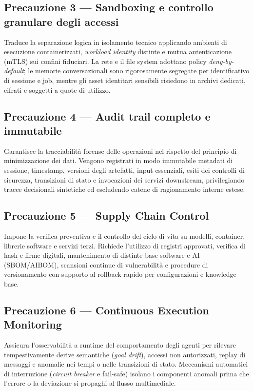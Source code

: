 \documentclass[11pt,a4paper]{article}
\begin{document}
\subsection{Precauzione 3 --- Sandboxing e controllo granulare degli accessi}
Traduce la separazione logica in isolamento tecnico applicando ambienti di esecuzione containerizzati, \emph{workload identity} distinte e mutua autenticazione (mTLS) sui confini fiduciari. La rete e il file system adottano policy \emph{deny-by-default}; le memorie conversazionali sono rigorosamente segregate per identificativo di sessione e job, mentre gli asset identitari sensibili risiedono in archivi dedicati, cifrati e soggetti a quote di utilizzo.

\subsection{Precauzione 4 --- Audit trail completo e immutabile}
Garantisce la tracciabilità forense delle operazioni nel rispetto del principio di minimizzazione dei dati. Vengono registrati in modo immutabile metadati di sessione, timestamp, versioni degli artefatti, input essenziali, esiti dei controlli di sicurezza, transizioni di stato e invocazioni dei servizi downstream, privilegiando tracce decisionali sintetiche ed escludendo catene di ragionamento interne estese.

\subsection{Precauzione 5 --- Supply Chain Control}
Impone la verifica preventiva e il controllo del ciclo di vita su modelli, container, librerie software e servizi terzi. Richiede l'utilizzo di registri approvati, verifica di hash e firme digitali, mantenimento di distinte base software e AI (SBOM/AIBOM), scansioni continue di vulnerabilità e procedure di versionamento con supporto al rollback rapido per configurazioni e knowledge base.

\subsection{Precauzione 6 --- Continuous Execution Monitoring}
Assicura l'osservabilità a runtime del comportamento degli agenti per rilevare tempestivamente derive semantiche (\emph{goal drift}), accessi non autorizzati, replay di messaggi e anomalie nei tempi o nelle transizioni di stato. Meccanismi automatici di interruzione (\emph{circuit breaker} e fail-safe) isolano i componenti anomali prima che l'errore o la deviazione si propaghi al flusso multimediale.
\end{document}
